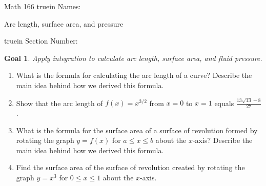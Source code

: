 \documentclass[12pt]{article}
\newtheorem*{goal}{Goal}
\begin{document}
\pagestyle{empty} %

\noindent
{Math 166  truein  Names:\ \hrulefill}

\noindent
{Arc length, surface area, and pressure}

\noindent {} truein  Section Number:\ \hrulefill
\medskip

\begin{goal} \rm
Apply integration to calculate arc length, surface area, and fluid pressure.
\end{goal}

\begin{enumerate}
\item What is the formula for calculating the arc length of a curve? Describe the main idea behind how we derived this formula.
\vspace{1in}


\item Show that the arc length of $f(x)=x^{3/2}$ from $x=0$ to $x=1$ equals $\frac{13\sqrt{13}-8}{27}$.



\vspace{3.25in}





\item  What is the formula for the surface area of a surface of revolution formed by rotating the graph $y=f(x)$ for $a\leq x\leq b$ about the $x$-axis? Describe the main idea behind how we derived this formula.

\vspace{1in}


\pagebreak
\item Find the surface area of the surface of revolution created by rotating the graph $y=x^3$ for $0\leq x\leq 1$ about the $x$-axis.


\vspace{3.75in}


\end{enumerate}
\end{document}
